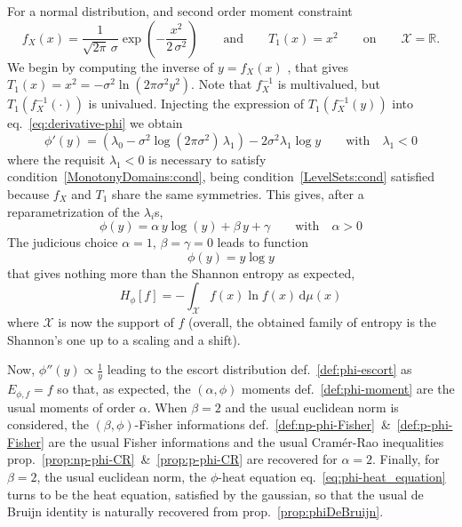 \documentclass[entropy,article,submit,moreauthors,pdftex]{Definitions/mdpi}
\newcommand{\SZ}[1]{{\color{blue} #1}}                                       %
\def\dmu{\mathrm{d}\mu}%
\def\Rset{\mathbb{R}}%
\def\X{\mathcal{X}}%
\begin{document}
For a normal distribution, and second order moment constraint 
%
\[
f_X(x) =  \frac{1}{\sqrt{2\pi} \,\sigma}  \exp\left( -\frac{x^2}{2  \, \sigma^2}
\right)  \qquad \mbox{and}  \qquad T_1(x)  = x^2  \qquad \mbox{on}  \qquad \X  =
\Rset.
\]
%
We begin by computing the inverse of  $y = f_X(x)$\SZ{, that gives $T_1(x) = x^2
  = -  \sigma^2 \ln \left(2 \pi  \sigma^2 y^2 \right)$. Note  that $f_X^{-1}$ is
  multivalued,  but   $T_1\left(  f_X^{-1}(  \cdot  )   \right)$  is  univalued.
  Injecting   the   expression   of   $T_1\left(   f_X^{-1}(y)   \right)$   into
  eq.~\eqref{eq:derivative-phi} we obtain}
%
\[
\phi'(y) = \left( \lambda_0 - \sigma^2 \log(2 \pi \sigma^2) \, \lambda_1 \right)
- 2 \sigma^2 \lambda_1 \log y \qquad \mbox{with} \quad \lambda_1 < 0
\]
%
\SZ{where   the    requisit   $\lambda_1    <0$   is   necessary    to   satisfy
  condition~\ref{MonotonyDomains:cond},   being   condition~\ref{LevelSets:cond}
  satisfied because $f_X$ and $T_1$ share the same symmetries. This gives, after
  a reparametrization of the $\lambda_i$s,
  \[
  \phi(y)  = \alpha \,  y \log(y)  + \beta \,  y +  \gamma \qquad
  \mbox{with} \quad \alpha > 0
  \]
%
The judicious choice $\alpha = 1, \, \beta = \gamma = 0$
%
}
%
leads to function
%
\[
\phi(y) = y \log y
\]
%
that gives nothing  more than the Shannon entropy as expected,
%
\SZ{
  \[
  H_\phi[f] = - \int_\X f(x) \ln f(x) \, \dmu(x) 
  \]
  where $\X$ is now the support of  $f$ (overall, the obtained family of entropy
  is the Shannon's one up to a scaling and a shift).}

Now,   $\phi''(y)  \propto   \frac1y$   leading  to   the  escort   distribution
\SZ{def.~\ref{def:phi-escort} as}  $E_{\phi,f} =  f$ so  that, as  expected, the
$(\alpha,\phi)$ moments \SZ{def.~\ref{def:phi-moment}} are  the usual moments of
order $\alpha$.   When $\beta = 2$  and the usual euclidean  norm is considered,
the                      $(\beta,\phi)$-Fisher                      informations
\SZ{def.~\ref{def:np-phi-Fisher}~\&~\ref{def:p-phi-Fisher}} are the usual Fisher
informations       and      the       usual      Cram\'er-Rao       inequalities
\SZ{prop.~\ref{prop:np-phi-CR}~\&~\ref{prop:p-phi-CR}} are recovered for $\alpha
=  2$.  Finally,  for $\beta  = 2$,  the usual  euclidean norm,  the $\phi$-heat
equation \SZ{eq.~\eqref{eq:phi-heat_equation}}  turns to  be the  heat equation,
satisfied by  the gaussian, so  that the usual  de Bruijn identity  is naturally
recovered \SZ{from prop.~\ref{prop:phiDeBruijn}}.
\end{document}
